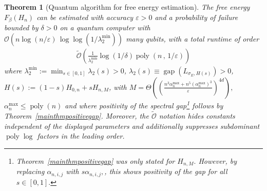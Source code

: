 \documentclass[11pt]{amsart}
\newcommand{\1}{\mathbbm{1}}
\newcommand{\eps}{\varepsilon}
\theoremstyle{plain}
\newtheorem{theorem}{Theorem}[section]
\theoremstyle{definition}
\theoremstyle{remark}
\numberwithin{equation}{section}
\begin{document}
\begin{theorem}[Quantum algorithm for free energy estimation]
\label{thm:FreeEnergyCoulombQuantumAlgorithm}
The free energy $F_\beta(H_n)$ can be estimated with accuracy $\eps>0$ and a probability of failure bounded by $\delta>0$ on a quantum computer with $\mathcal{O}\left(n\log( n/\eps)\,\log\log(1/\lambda^{\min}_{2})\right)$ many qubits, with a total runtime of order 
\begin{align*}
    \widetilde{ \mathcal{O}}\left(\frac{1}{\lambda^{\min}_{2}}\log\left(1/\delta\right)\operatorname{poly}\left(n\,,\,1/\eps\right)\right)
\end{align*}
where $\lambda^{\min}_{2}:= \min_{s\in[0,1]} \lambda_2(s)>0$, $\lambda_2(s)\equiv\operatorname{gap}(L_{\sigma_E,H(s)})>0$, $H(s):=(1-s)H_{0,n}+sH_{n,M}$, with $M=\Theta\left(\left(\frac{n^3\alpha^{\max}_n+n^{5}(\alpha^{\max}_n)^3}{\varepsilon}\right)^{4d}\right),$ $\alpha^{\max}_n\le\operatorname{poly}(n)$ and where positivity of the spectral gap\footnote{Theorem~\ref{mainthmpositivegap} was only stated for $H_{n,M}.$ However, by replacing $\alpha_{n,i,j}$ with $s\alpha_{n,i,j},$, this shows positivity of the gap for all $s\in[0,1].$} follows by Theorem~\ref{mainthmpositivegap}.
 Moreover, the $\widetilde{\mathcal{O}}$ notation hides constants independent of the displayed parameters and additionally suppresses subdominant $\operatorname{poly}\log$ factors in the leading order.
\end{theorem}
\end{document}
